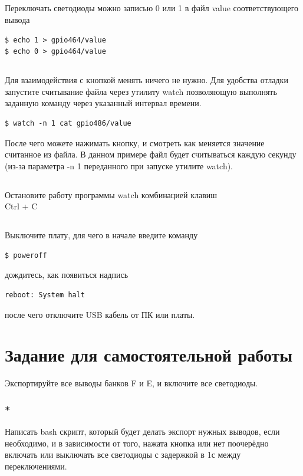 \subsection{} Переключать светодиоды можно записью 0 или 1 в файл value соответствующего вывода
\begin{lstlisting}[style=bash]
$ echo 1 > gpio464/value
$ echo 0 > gpio464/value
\end{lstlisting}

\subsection{} Для взаимодействия с кнопкой менять ничего не нужно. Для удобства отладки запустите считывание файла через утилиту watch позволяющую выполнять заданную команду через указанный интервал времени.

\begin{lstlisting}[style=bash]
$ watch -n 1 cat gpio486/value
\end{lstlisting}

После чего можете нажимать кнопку, и смотреть как меняется значение считанное из файла. В данном примере файл будет считываться каждую секунду (из-за параметра -n 1 переданного при запуске утилите watch).  

\subsection{} Остановите работу программы watch комбинацией клавиш \\ Ctrl + C

\subsection{} Выключите плату, для чего в начале введите команду
\begin{lstlisting}[style=bash]
	$ poweroff
\end{lstlisting}
дождитесь, как появиться надпись
\begin{lstlisting}[style=stdout]
	reboot: System halt
\end{lstlisting}
после чего отключите USB кабель от ПК или платы. 

\section{Задание для самостоятельной работы}
Экспортируйте все выводы банков F и E, и включите все светодиоды.

\subsubsection{*} Написать bash скрипт, который будет делать экспорт нужных выводов, если необходимо, и в зависимости от того, нажата кнопка или нет поочерёдно включать или выключать все светодиоды с задержкой в 1с между переключениями. 
